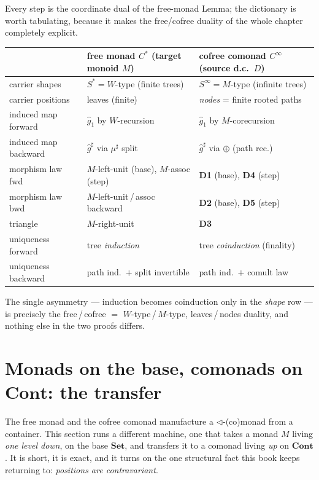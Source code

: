 \documentclass[11pt,a4paper]{book}
\newcommand{\Set}{\mathbf{Set}}
\newcommand{\Cont}{\mathbf{Cont}}
\theoremstyle{plain}
\theoremstyle{definition}
\theoremstyle{remark}
\begin{document}
Every step is the coordinate dual of the free-monad Lemma; the dictionary is worth tabulating,
because it makes the free/cofree duality of the whole chapter completely explicit.
\begin{center}
\renewcommand{\arraystretch}{1.2}
\begin{tabular}{@{}p{4.5cm}p{4.7cm}p{4.7cm}@{}}
\toprule
 & \textbf{free monad $C^{*}$ (target monoid $M$)} & \textbf{cofree comonad $C^{\infty}$ (source d.c.\ $D$)} \\
\midrule
carrier shapes      & $S^{*}=W$-type (finite trees)        & $S^{\infty}=M$-type (infinite trees) \\
carrier positions   & leaves (finite)                     & \emph{nodes} = finite rooted paths \\
induced map forward & $\widehat g_{1}$ by $W$-recursion    & $\widehat g_{1}$ by $M$-corecursion \\
induced map backward& $\widehat g^{\sharp}$ via $\mu^{\sharp}$ split & $\widehat g^{\sharp}$ via $\oplus$ (path rec.) \\
morphism law fwd    & $M$-left-unit (base), $M$-assoc (step) & \textbf{D1} (base), \textbf{D4} (step) \\
morphism law bwd    & $M$-left-unit\,/\,assoc backward     & \textbf{D2} (base), \textbf{D5} (step) \\
triangle            & $M$-right-unit                       & \textbf{D3} \\
uniqueness forward   & tree \emph{induction}               & tree \emph{coinduction} (finality) \\
uniqueness backward  & path ind.\ $+$ split invertible     & path ind.\ $+$ comult law \\
\bottomrule
\end{tabular}
\end{center}
The single asymmetry --- induction becomes coinduction only in the \emph{shape} row --- is
precisely the free\,/\,cofree $=$ $W$-type\,/\,$M$-type, leaves\,/\,nodes duality, and nothing
else in the two proofs differs.

\section{Monads on the base, comonads on \texorpdfstring{$\Cont$}{Cont}: the transfer}
\label{sec:moncomon-transfer}

The free monad and the cofree comonad manufacture a $\triangleleft$-(co)monad from a container.
This section runs a different machine, one that takes a monad $M$ living \emph{one level down},
on the base $\Set$, and transfers it to a comonad living \emph{up} on $\Cont$. It is short,
it is exact, and it turns on the one structural fact this book keeps returning to: \emph{positions
are contravariant}.
\end{document}
